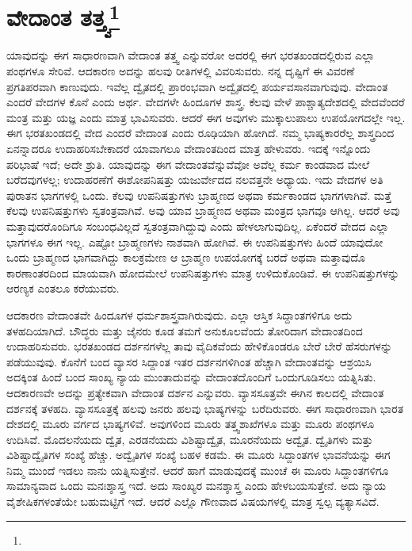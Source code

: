 
\chapter{ವೇದಾಂತ ತತ್ತ್ವ\protect\footnote{}}

ಯಾವುದನ್ನು ಈಗ ಸಾಧಾರಣವಾಗಿ ವೇದಾಂತ ತತ್ತ್ವ ಎನ್ನುವರೋ ಅದರಲ್ಲಿ ಈಗ ಭರತಖಂಡದಲ್ಲಿರುವ ಎಲ್ಲಾ ಪಂಥಗಳೂ ಸೇರಿವೆ. ಆದಕಾರಣ ಅದನ್ನು ಹಲವು ರೀತಿಗಳಲ್ಲಿ ವಿವರಿಸುವರು. ನನ್ನ ದೃಷ್ಟಿಗೆ ಈ ವಿವರಣೆ ಪ್ರಗತಿಪರವಾಗಿ ಕಾಣುವುದು. ಇವೆಲ್ಲ ದ್ವೈತದಲ್ಲಿ ಪ್ರಾರಂಭವಾಗಿ ಅದ್ವೈತದಲ್ಲಿ ಪರ್ಯವಸಾನವಾಗುವುವು. ವೇದಾಂತ ಎಂದರೆ ವೇದಗಳ ಕೊನೆ ಎಂದು ಅರ್ಥ. ವೇದಗಳೇ ಹಿಂದೂಗಳ ಶಾಸ್ತ್ರ. ಕೆಲವು ವೇಳೆ ಪಾಶ್ಚಾತ್ಯದೇಶದಲ್ಲಿ ವೇದವೆಂದರೆ ಮಂತ್ರ ಮತ್ತು ಯಜ್ಞ ಎಂದು ಮಾತ್ರ ಭಾವಿಸುವರು. ಆದರೆ ಈಗ ಅವುಗಳು ಮುಕ್ಕಾಲುಪಾಲು ಉಪಯೋಗದಲ್ಲೇ ಇಲ್ಲ. ಈಗ ಭರತಖಂಡದಲ್ಲಿ ವೇದ ಎಂದರೆ ವೇದಾಂತ ಎಂದು ರೂಢಿಯಾಗಿ ಹೋಗಿದೆ. ನಮ್ಮ ಭಾಷ್ಯಕಾರರೆಲ್ಲ ಶಾಸ್ತ್ರದಿಂದ ಏನನ್ನಾದರೂ ಉದಾಹರಿಸಬೇಕಾದರೆ ಯಾವಾಗಲೂ ವೇದಾಂತದಿಂದ ಮಾತ್ರ ಹೇಳುವರು. ಇದಕ್ಕೆ ಇನ್ನೊಂದು ಪರಿಭಾಷೆ ಇದೆ; ಅದೇ ಶ್ರುತಿ. ಯಾವುದನ್ನು ಈಗ ವೇದಾಂತವೆನ್ನುವೆವೋ ಅವೆಲ್ಲ ಕರ್ಮ ಕಾಂಡವಾದ ಮೇಲೆ ಬರೆದವುಗಳಲ್ಲ; ಉದಾಹರಣೆಗೆ ಈಶೋಪನಿಷತ್ತು ಯಜುರ್ವೇದದ ನಲವತ್ತನೇ ಅಧ್ಯಾಯ. ಇದು ವೇದಗಳ ಅತಿ ಪುರಾತನ ಭಾಗಗಳಲ್ಲಿ ಒಂದು. ಕೆಲವು ಉಪನಿಷತ್ತುಗಳು ಬ್ರಾಹ್ಮಣದ ಅಥವಾ ಕರ್ಮಕಾಂಡದ ಭಾಗಗಳಾಗಿವೆ. ಮತ್ತೆ ಕೆಲವು ಉಪನಿಷತ್ತುಗಳು ಸ್ವತಂತ್ರವಾಗಿವೆ. ಅವು ಯಾವ ಬ್ರಾಹ್ಮಣದ ಅಥವಾ ಮಂತ್ರದ ಭಾಗವೂ ಆಗಿಲ್ಲ. ಆದರೆ ಅವು ಮತ್ತಾವುದರೊಂದಿಗೂ ಸಂಬಂಧವಿಲ್ಲದೆ ಸ್ವತಂತ್ರವಾಗಿದ್ದುವು ಎಂದು ಹೇಳಲಾಗುವುದಿಲ್ಲ. ಏಕೆಂದರೆ ವೇದದ ಎಲ್ಲಾ ಭಾಗಗಳೂ ಈಗ ಇಲ್ಲ. ಎಷ್ಟೋ ಬ್ರಾಹ್ಮಣಗಳು ನಾಶವಾಗಿ ಹೋಗಿವೆ. ಈ ಉಪನಿಷತ್ತುಗಳು ಹಿಂದೆ ಯಾವುದೋ ಒಂದು ಬ್ರಾಹ್ಮಣದ ಭಾಗವಾಗಿದ್ದು ಕಾಲಕ್ರಮೇಣ ಆ ಬ್ರಾಹ್ಮಣ ಉಪಯೋಗಕ್ಕೆ ಬರದೆ ಅಥವಾ ಮತ್ತಾವುದೊ ಕಾರಣಾಂತರದಿಂದ ಮಾಯವಾಗಿ ಹೋದಮೇಲೆ ಉಪನಿಷತ್ತುಗಳು ಮಾತ್ರ ಉಳಿದುಕೊಂಡಿವೆ. ಈ ಉಪನಿಷತ್ತುಗಳನ್ನು ಆರಣ್ಯಕ ಎಂತಲೂ ಕರೆಯುವರು.

ಆದಕಾರಣ ವೇದಾಂತವೇ ಹಿಂದೂಗಳ ಧರ್ಮಶಾಸ್ತ್ರವಾಗಿರುವುದು. ಎಲ್ಲಾ ಆಸ್ತಿಕ ಸಿದ್ದಾಂತಗಳಿಗೂ ಅದು ತಳಹದಿಯಾಗಿದೆ. ಬೌದ್ಧರು ಮತ್ತು ಜೈನರು ಕೂಡ ತಮಗೆ ಅನುಕೂಲವೆಂದು ತೋರಿದಾಗ ವೇದಾಂತದಿಂದ ಉದಾಹರಿಸುವರು. ಭರತಖಂಡದ ದರ್ಶನಗಳೆಲ್ಲ ತಾವು ವೈದಿಕವೆಂದು ಹೇಳಿಕೊಂಡರೂ ಬೇರೆ ಬೇರೆ ಹೆಸರುಗಳನ್ನು ಪಡೆಯುವುವು. ಕೊನೆಗೆ ಬಂದ ವ್ಯಾಸರ ಸಿದ್ದಾಂತ ಇತರ ದರ್ಶನಗಳಿಗಿಂತ ಹೆಚ್ಚಾಗಿ ವೇದಾಂತವನ್ನು ಆಶ್ರಯಿಸಿ ಅದಕ್ಕಿಂತ ಹಿಂದೆ ಬಂದ ಸಾಂಖ್ಯ ನ್ಯಾಯ ಮುಂತಾದುವನ್ನು ವೇದಾಂತದೊಂದಿಗೆ ಒಂದುಗೂಡಿಸಲು ಯತ್ನಿಸಿತು. ಆದಕಾರಣವೇ ಅದನ್ನು ಪ್ರತ್ಯೇಕವಾಗಿ ವೇದಾಂತ ದರ್ಶನ ಎನ್ನುವರು. ವ್ಯಾಸಸೂತ್ರವೇ ಈಗಿನ ಕಾಲದಲ್ಲಿ ವೇದಾಂತ ದರ್ಶನಕ್ಕೆ ತಳಹದಿ. ವ್ಯಾಸಸೂತ್ರಕ್ಕೆ ಹಲವು ಜನರು ಹಲವು ಭಾಷ್ಯಗಳನ್ನು ಬರೆದಿರುವರು. ಈಗ ಸಾಧಾರಣವಾಗಿ ಭಾರತ ದೇಶದಲ್ಲಿ ಮೂರು ವರ್ಗದ ಭಾಷ್ಯಗಳಿವೆ. ಅವುಗಳಿಂದ ಮೂರು ತತ್ತ್ವಶಾಖೆಗಳೂ ಮತ್ತು ಮೂರು ಪಂಥಗಳೂ ಉದಿಸಿವೆ. ಮೊದಲನೆಯದು ದ್ವೈತ, ಎರಡನೆಯದು ವಿಶಿಷ್ಟಾದ್ವೈತ, ಮೂರನೆಯದು ಅದ್ವೈತ. ದ್ವೈತಿಗಳು ಮತ್ತು ವಿಶಿಷ್ಟಾದ್ವೈತಿಗಳ ಸಂಖ್ಯೆ ಹೆಚ್ಚು. ಅದ್ವೈತಿಗಳ ಸಂಖ್ಯೆ ಬಹಳ ಕಡಮೆ. ಈ ಮೂರು ಸಿದ್ದಾಂತಗಳ ಭಾವನೆಯನ್ನು ಈಗ ನಿಮ್ಮ ಮುಂದೆ ಇಡಲು ನಾನು ಯತ್ನಿಸುತ್ತೇನೆ. ಆದರೆ ಹಾಗೆ ಮಾಡುವುದಕ್ಕೆ ಮುಂಚೆ ಈ ಮೂರು ಸಿದ್ದಾಂತಗಳಿಗೂ ಸಾಮಾನ್ಯವಾದ ಒಂದು ಮನಃಶ್ಶಾಸ್ತ್ರ ಇದೆ. ಅದು ಸಾಂಖ್ಯರ ಮನಶ್ಶಾಸ್ತ್ರ ಎಂದು ಹೇಳಬಯಸುತ್ತೇನೆ. ಅದು ನ್ಯಾಯ ವೈಶೇಷಿಕಗಳಂತೆಯೇ ಬಹುಮಟ್ಟಿಗೆ ಇದೆ. ಆದರೆ ಎಲ್ಲೊ ಗೌಣವಾದ ವಿಷಯಗಳಲ್ಲಿ ಮಾತ್ರ ಸ್ವಲ್ಪ ವ್ಯತ್ಯಾಸವಿದೆ.

